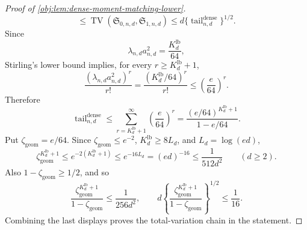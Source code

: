 \begin{proof}[Proof of \cref{obj:lem:dense-moment-matching-lower}]
\[\le
\operatorname{TV}(\mathfrak S_{0,n,d},\mathfrak S_{1,n,d})
\le
d\{\operatorname{tail}_{n,d}^{\mathrm{dense}}\}^{1/2}.
\]
Since
\[
\lambda_{n,d}a_{n,d}^2=\frac{K_d^{\mathrm{lb}}}{64},
\]
Stirling's lower bound implies, for every \(r\ge K_d^{\mathrm{lb}}+1\),
\[
\frac{(\lambda_{n,d}a_{n,d}^2)^r}{r!}
=
\frac{(K_d^{\mathrm{lb}}/64)^r}{r!}
\le
\left(\frac e{64}\right)^r.
\]
Therefore
\[
\operatorname{tail}_{n,d}^{\mathrm{dense}}
\le
\sum_{r=K_d^{\mathrm{lb}}+1}^\infty \left(\frac e{64}\right)^r
=
\frac{(e/64)^{K_d^{\mathrm{lb}}+1}}{1-e/64}.
\]
Put \(\zeta_{\mathrm{geom}}=e/64\). Since \(\zeta_{\mathrm{geom}}\le e^{-2}\), \(K_d^{\mathrm{lb}}\ge8L_d\), and \(L_d=\log(ed)\),
\[
\zeta_{\mathrm{geom}}^{K_d^{\mathrm{lb}}+1}
\le
e^{-2(K_d^{\mathrm{lb}}+1)}
\le
e^{-16L_d}
=
(ed)^{-16}
\le
\frac{1}{512d^2}
\qquad(d\ge2).
\]
Also \(1-\zeta_{\mathrm{geom}}\ge1/2\), and so
\[
\frac{\zeta_{\mathrm{geom}}^{K_d^{\mathrm{lb}}+1}}{1-\zeta_{\mathrm{geom}}}
\le
\frac{1}{256d^2},
\qquad
d\left\{\frac{\zeta_{\mathrm{geom}}^{K_d^{\mathrm{lb}}+1}}{1-\zeta_{\mathrm{geom}}}\right\}^{1/2}
\le
\frac1{16}.
\]
Combining the last displays proves the total-variation chain in the statement.


\end{proof}

